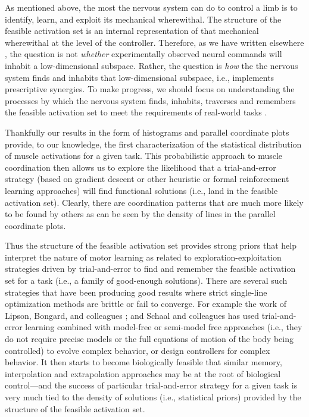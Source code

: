 As mentioned above, the most the nervous system can do to control a limb is  to identify, learn, and exploit its mechanical wherewithal. The structure of the feasible activation set is an internal representation of that mechanical wherewithal at the level of the controller. Therefore, as we have written elsewhere \cite{valero-cuevas2015fundamentals,kutch2012challenges}, the question is not \emph{whether} experimentally observed neural commands will inhabit a low-dimensional subspace. Rather, the question is \emph{how}  the the nervous system finds and inhabits that low-dimensional subspace, i.e., implements prescriptive synergies. To make progress, we should focus on understanding the  processes by which the nervous system finds, inhabits, traverses and remembers the feasible activation set to meet the requirements of real-world tasks   \cite{racz2013spatiotemporal,dingwell2010walkingvariability,Keenan2009Maximal,Venkadesan2008Neural,giszter2015motor}.  

Thankfully our results in the form of histograms and parallel coordinate plots provide, to our knowledge, the first characterization of the statistical distribution of muscle activations for a given task. This probabilistic approach to muscle coordination then allows us to explore the likelihood that a trial-and-error strategy (based on gradient descent or other heuristic or formal reinforcement learning approaches) will find functional solutions (i.e., land in the feasible activation set). Clearly, there are coordination patterns that are  much more likely to be found by others as can be seen by the density of lines in the parallel coordinate plots.

Thus the structure of the feasible activation set provides strong priors that help interpret the nature  of motor learning as related to  exploration-exploitation  strategies driven by  trial-and-error to find and remember the feasible activation set for a task (i.e., a family of good-enough solutions). There are several such strategies that have been producing good results where strict single-line optimization methods are brittle or fail to converge. For example the work of Lipson, Bongard, and colleagues \cite{bongard2006Resilient,lipson2000automatic,Rieffel2009Morphological}; and Schaal and colleagues \cite{theodorou2011ACC_finger_OC,theodorou2010PiSquared,kalakrishnan2011littleDog} has used  trial-and-error learning combined with model-free or semi-model free approaches (i.e., they do not require precise models or the full equations of motion of the body being controlled) to evolve complex behavior, or design controllers for complex behavior.   It then starts to become biologically feasible that similar memory, interpolation and extrapolation approaches may be at the root of  biological control---and the success of particular trial-and-error strategy for a given task is very much tied to the  density of solutions (i.e., statistical priors) provided by the structure of the feasible activation set.

